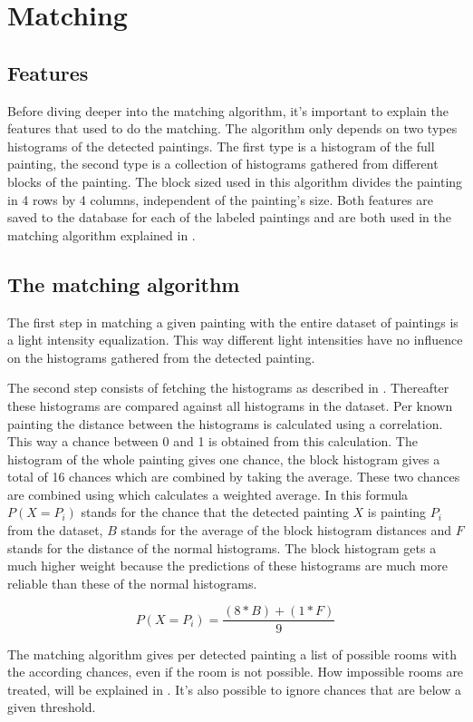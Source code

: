 \section{Matching}
\label{sec:matching}

\subsection{Features}
\label{subsec:the-features}

Before diving deeper into the matching algorithm, it's important to explain the features that used to do the matching. The algorithm only depends on two types histograms of the detected paintings. The first type is a histogram of the full painting, the second type is a collection of histograms gathered from different blocks of the painting. The block sized used in this algorithm divides the painting in 4 rows by 4 columns, independent of the painting's size. Both features are saved to the database for each of the labeled paintings and are both used in the matching algorithm explained in .

\subsection{The matching algorithm}
\label{subsec:matching-algo}

The first step in matching a given painting with the entire dataset of paintings is a light intensity equalization. This way different light intensities have no influence on the histograms gathered from the detected painting.

The second step consists of fetching the histograms as described in . Thereafter these histograms are compared against all histograms in the dataset. Per known painting the distance between the histograms is calculated using a correlation. This way a chance between 0 and 1 is obtained from this calculation. The histogram of the whole painting gives one chance, the block histogram gives a total of 16 chances which are combined by taking the average. These two chances are combined using  which calculates a weighted average. In this formula $P(X = P_{i})$ stands for the chance that the detected painting $X$ is painting $P_{i}$ from the dataset, $B$ stands for the average of the block histogram distances and $F$ stands for the distance of the normal histograms. The block histogram gets a much higher weight because the predictions of these histograms are much more reliable than these of the normal histograms.

\begin{equation}
    \label{eq:histogram-score}
    P(X = P_{i}) = \frac{(8 * B) + (1 * F)}{9}
\end{equation}

The matching algorithm gives per detected painting a list of possible rooms with the according chances, even if the room is not possible. How impossible rooms are treated, will be explained in . It's also possible to ignore chances that are below a given threshold.




